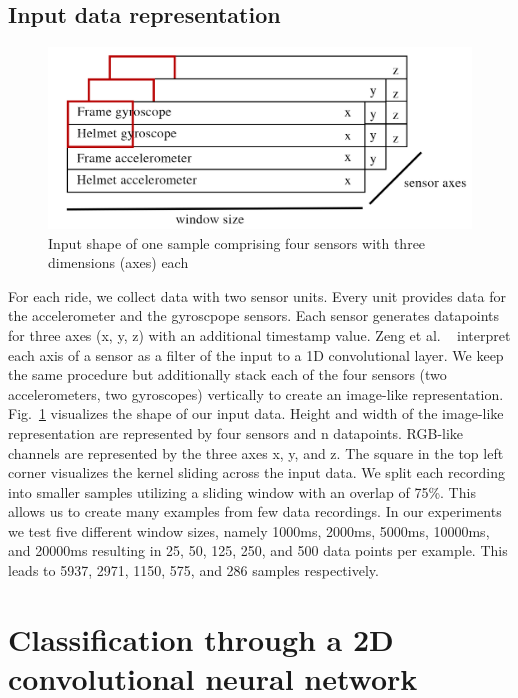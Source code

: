 \documentclass[runningheads]{llncs}
\begin{document}
\FloatBarrier

\subsection{Input data representation}

\begin{figure}
\includegraphics[width=\textwidth]{input_shape.png}
\caption{Input shape of one sample comprising four sensors with three dimensions (axes) each}
\label{fig2}	
\end{figure}

For each ride, we collect data with two sensor units.
Every unit provides data for the accelerometer and the gyroscpope sensors.
Each sensor generates datapoints for three axes (x, y, z) with an additional timestamp value.
Zeng et al. ~\cite{zeng2014convolutional} interpret each axis of a sensor as a filter of the input to a 1D convolutional layer.
We keep the same procedure but additionally stack each of the four sensors (two accelerometers, two gyroscopes) vertically to create an image-like representation.
Fig.~\ref{fig2} visualizes the shape of our input data.
Height and width of the image-like representation are represented by four sensors and n datapoints.
RGB-like channels are represented by the three axes x, y, and z.
The square in the top left corner visualizes the kernel sliding across the input data.
We split each recording into smaller samples utilizing a sliding window with an overlap of 75\%.
This allows us to create many examples from few data recordings.
In our experiments we test five different window sizes, namely 1000ms, 2000ms, 5000ms, 10000ms, and 20000ms resulting in 25, 50, 125, 250, and 500 data points per example.
This leads to 5937, 2971, 1150, 575, and 286 samples respectively.

\section{Classification through a 2D convolutional neural network}
\end{document}

